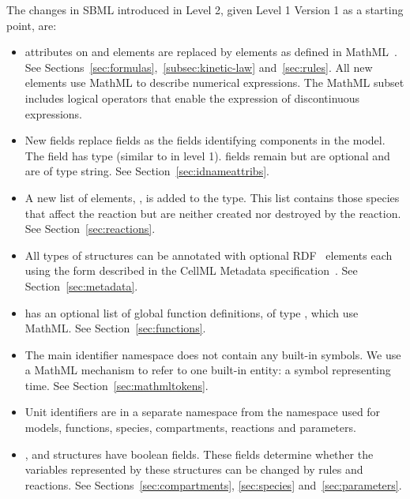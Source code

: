 \documentclass[10pt]{cekarticle}
\begin{document}
The changes in SBML introduced in Level 2, given Level 1 Version 1
as a starting point, are:

\begin{itemize}
\item {} attributes on  and
 elements are replaced by  elements as
defined in MathML~\citep{w3c:2000b}.  See
Sections~\ref{sec:formulas},~\ref{subsec:kinetic-law}
and~\ref{sec:rules}.  All new elements use MathML to describe
numerical expressions.  The MathML subset includes logical operators that enable the expression of discontinuous expressions.

\item New  fields replace  fields as the
fields identifying components in the model. The  field
has type  (similar to  in level 1).
 fields remain but are optional and are of type
string.  See Section~\ref{sec:idnameattribs}.

\item A new list of elements, , is added
to the  type.  This list contains those species
that affect the reaction but are neither created nor destroyed by
the reaction.  See Section~\ref{sec:reactions}.

\item All types of structures can be annotated with optional
RDF~\citep{lassila:1999} elements each using the form described in
the CellML Metadata specification~\citep{cuellar:2002}.  See
Section~\ref{sec:metadata}.

\item {} has an optional list of global function
definitions, of type , which use MathML. See
Section~\ref{sec:functions}.

\item The main identifier namespace does not contain any built-in
symbols.  We use a MathML mechanism to refer to one built-in entity: a symbol representing time. See Section~\ref{sec:mathmltokens}.

\item Unit identifiers are in a separate namespace from the
namespace used for models, functions, species, compartments,
reactions and parameters.

\item {},  and 
structures have boolean  fields.  These fields
determine whether the variables represented by these structures
can be changed by rules and reactions.  See
Sections~\ref{sec:compartments}, \ref{sec:species}
and~\ref{sec:parameters}.


\end{itemize}
\end{document}
